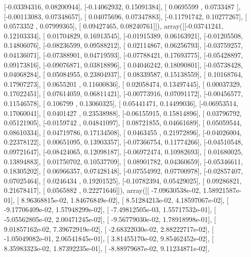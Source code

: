 \documentclass{article}
\begin{document}
       [-0.03394316,  0.08200944],
       [-0.14062932,  0.15091384],
       [ 0.0695599 ,  0.0733487 ],
       [-0.00113083,  0.07348657],
       [ 0.04075696,  0.07347883],
       [-0.11791742,  0.10277267],
       [ 0.0573352 ,  0.07999365],
       [ 0.09427465,  0.08240761]]), array([[-0.03741241,  0.12103334],
       [ 0.01704829,  0.16913545],
       [-0.01915389,  0.06163921],
       [-0.01205508,  0.14806076],
       [-0.08236599,  0.09588212],
       [ 0.02114867,  0.06256793],
       [-0.03759257,  0.04136071],
       [-0.07388901,  0.04719593],
       [-0.07788421,  0.17693775],
       [-0.05428897,  0.09173816],
       [-0.09076871,  0.03818896],
       [ 0.04046242,  0.18090801],
       [-0.05738428,  0.04068284],
       [ 0.05084955,  0.23804937],
       [ 0.08339587,  0.15138559],
       [ 0.10168764,  0.17907273],
       [ 0.0655201 ,  0.11600836],
       [ 0.02058474,  0.13497445],
       [ 0.00037329,  0.17022451],
       [ 0.07614059,  0.06811421],
       [-0.00773916,  0.07091172],
       [-0.00456577,  0.11546578],
       [ 0.106799  ,  0.13060325],
       [ 0.05441471,  0.14499036],
       [-0.06953514,  0.17060041],
       [ 0.0401427 ,  0.23538988],
       [-0.06155915,  0.15814896],
       [ 0.03796792,  0.05121905],
       [-0.0159742 ,  0.04841097],
       [ 0.08721855,  0.04661689],
       [ 0.05059544,  0.08610334],
       [ 0.04719786,  0.17134508],
       [ 0.0463455 ,  0.21972896],
       [-0.04026004,  0.22378122],
       [ 0.00651095,  0.13903357],
       [-0.07366754,  0.11774266],
       [-0.04510548,  0.09721647],
       [-0.08424065,  0.12098187],
       [-0.06972474,  0.10982693],
       [ 0.01680025,  0.13894883],
       [ 0.01750702,  0.10537709],
       [ 0.08901782,  0.04360659],
       [-0.05346611,  0.18305202],
       [ 0.06966357,  0.07428148],
       [-0.07554992,  0.07700978],
       [-0.02857407,  0.07025464],
       [ 0.0246434 ,  0.19201525],
       [-0.10782394,  0.05429025],
       [ 0.09286821,  0.21678417],
       [ 0.0565882 ,  0.22271646]]), array([[ -7.09630538e-02,   1.58921587e-01],
       [  8.96368815e-02,   1.84676849e-02],
       [  8.51284213e-02,   4.18597067e-02],
       [ -9.17706409e-02,   1.57948299e-02],
       [ -7.49812505e-03,   1.55717532e-01],
       [ -5.05562805e-02,   2.00471245e-02],
       [ -9.56779030e-02,   1.78918998e-01],
       [  9.01857162e-02,   7.39672919e-02],
       [ -2.68322030e-02,   2.88222717e-02],
       [ -1.05049082e-01,   2.06541845e-01],
       [  3.81455170e-02,   9.85462452e-02],
       [  8.35983323e-02,   1.87392235e-01],
       [ -8.88979687e-02,   9.11234871e-02],
\end{document}
